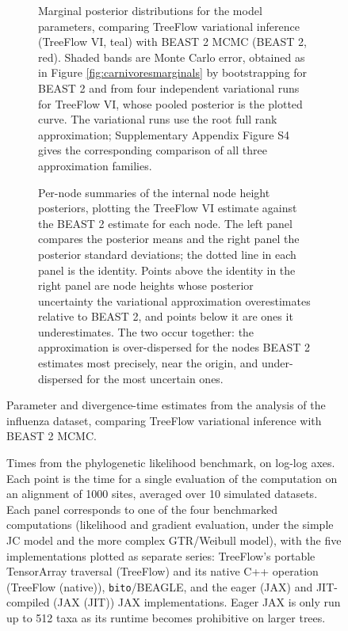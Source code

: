 \documentclass[oupdraft]{sysbio_sse}
\begin{document}
\begin{figure}[!ht]
    \begin{subfigure}[b]{\linewidth}
        \caption{Marginal posterior distributions for the model parameters, comparing TreeFlow variational inference (TreeFlow VI, teal) with BEAST 2 MCMC (BEAST 2, red). Shaded bands are Monte Carlo error, obtained as in Figure \ref{fig:carnivoresmarginals} by bootstrapping for BEAST 2 and from four independent variational runs for TreeFlow VI, whose pooled posterior is the plotted curve. The variational runs use the root full rank approximation; Supplementary Appendix Figure S4 gives the corresponding comparison of all three approximation families.}
        \label{fig:flumarginals}
    \end{subfigure}

    \begin{subfigure}[b]{\linewidth}
        \caption{Per-node summaries of the internal node height posteriors, plotting the TreeFlow VI estimate against the BEAST 2 estimate for each node. The left panel compares the posterior means and the right panel the posterior standard deviations; the dotted line in each panel is the identity. Points above the identity in the right panel are node heights whose posterior uncertainty the variational approximation overestimates relative to BEAST 2, and points below it are ones it underestimates. The two occur together: the approximation is over-dispersed for the nodes BEAST 2 estimates most precisely, near the origin, and under-dispersed for the most uncertain ones.}
        \label{fig:flutree}
    \end{subfigure}

    \caption{Parameter and divergence-time estimates from the analysis of the influenza dataset, comparing TreeFlow variational inference with BEAST 2 MCMC.}
\end{figure}

\begin{figure}[!ht]
    \caption{Times from the phylogenetic likelihood benchmark, on log-log axes. Each point is the time for a single evaluation of the computation on an alignment of 1000 sites, averaged over 10 simulated datasets. Each panel corresponds to one of the four benchmarked computations (likelihood and gradient evaluation, under the simple JC model and the more complex GTR/Weibull model), with the five implementations plotted as separate series: TreeFlow's portable TensorArray traversal (TreeFlow) and its native C++ operation (TreeFlow (native)), \texttt{bito}/BEAGLE, and the eager (JAX) and JIT-compiled (JAX (JIT)) JAX implementations. Eager JAX is only run up to 512 taxa as its runtime becomes prohibitive on larger trees.}
    \label{fig:benchmark}
\end{figure}
\end{document}
